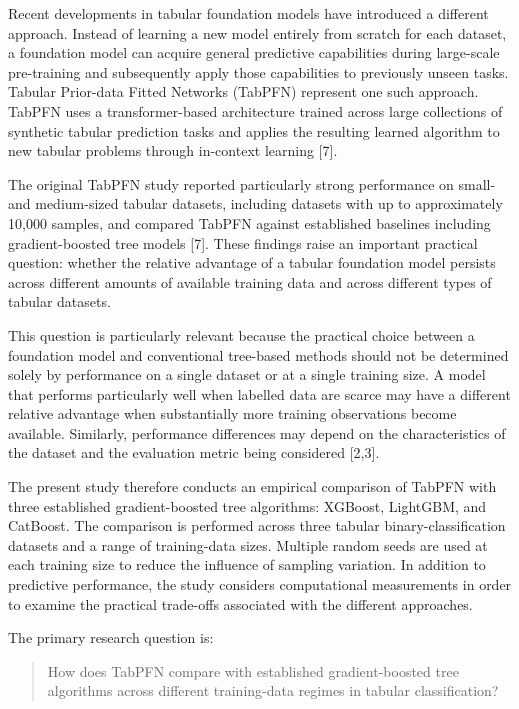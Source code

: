 Recent developments in tabular foundation models have introduced a different approach. Instead of learning a new model entirely from scratch for each dataset, a foundation model can acquire general predictive capabilities during large-scale pre-training and subsequently apply those capabilities to previously unseen tasks. Tabular Prior-data Fitted Networks (TabPFN) represent one such approach. TabPFN uses a transformer-based architecture trained across large collections of synthetic tabular prediction tasks and applies the resulting learned algorithm to new tabular problems through in-context learning {[}7{]}.

The original TabPFN study reported particularly strong performance on small- and medium-sized tabular datasets, including datasets with up to approximately 10,000 samples, and compared TabPFN against established baselines including gradient-boosted tree models {[}7{]}. These findings raise an important practical question: whether the relative advantage of a tabular foundation model persists across different amounts of available training data and across different types of tabular datasets.

This question is particularly relevant because the practical choice between a foundation model and conventional tree-based methods should not be determined solely by performance on a single dataset or at a single training size. A model that performs particularly well when labelled data are scarce may have a different relative advantage when substantially more training observations become available. Similarly, performance differences may depend on the characteristics of the dataset and the evaluation metric being considered {[}2,3{]}.

The present study therefore conducts an empirical comparison of TabPFN with three established gradient-boosted tree algorithms: XGBoost, LightGBM, and CatBoost. The comparison is performed across three tabular binary-classification datasets and a range of training-data sizes. Multiple random seeds are used at each training size to reduce the influence of sampling variation. In addition to predictive performance, the study considers computational measurements in order to examine the practical trade-offs associated with the different approaches.

The primary research question is:

\begin{quote}
How does TabPFN compare with established gradient-boosted tree algorithms across different training-data regimes in tabular classification?
\end{quote}

